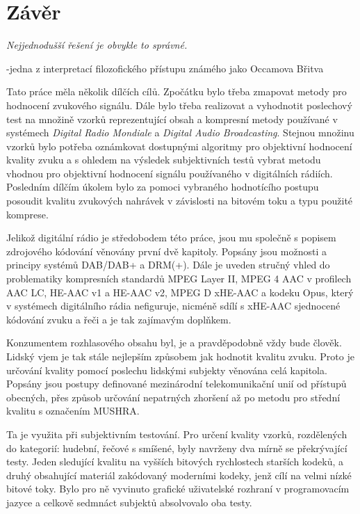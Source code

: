 \chapter{Závěr}
\label{chap:conclusion}

\epigraph{\textit{\hfill Nejjednodušší řešení je obvykle to správné.}}{-jedna z interpretací filozofického přístupu známého jako Occamova Břitva}

Tato práce měla několik dílčích cílů. Zpočátku bylo třeba zmapovat metody pro hodnocení zvukového signálu. Dále bylo třeba realizovat a vyhodnotit poslechový test na množině vzorků reprezentující obsah a kompresní metody používané v systémech \textit{Digital Radio Mondiale} a \textit{Digital Audio Broadcasting}. Stejnou množinu vzorků bylo potřeba oznámkovat dostupnými algoritmy pro objektivní hodnocení kvality zvuku a s ohledem na výsledek subjektivních testů vybrat metodu vhodnou pro objektivní hodnocení signálu používaného v digitálních rádiích. Posledním dílčím úkolem bylo za pomoci vybraného hodnotícího postupu posoudit kvalitu zvukových nahrávek v závislosti na bitovém toku a typu použité komprese.

Jelikož digitální rádio je středobodem této práce, jsou mu společně s popisem zdrojového kódování věnovány první dvě kapitoly. Popsány jsou možnosti a principy systémů DAB/DAB+ a DRM(+). Dále je uveden stručný vhled do problematiky kompresních standardů MPEG Layer II, MPEG 4 AAC v profilech AAC LC, HE-AAC v1 a HE-AAC v2, MPEG D xHE-AAC a kodeku Opus, který v systémech digitálního rádia nefiguruje, nicméně sdílí s xHE-AAC sjednocené kódování zvuku a řeči a je tak zajímavým doplňkem.

Konzumentem rozhlasového obsahu byl, je a pravděpodobně vždy bude člověk. Lidský vjem je tak stále nejlepším způsobem jak hodnotit kvalitu zvuku. Proto je určování kvality pomocí poslechu lidskými subjekty věnována celá kapitola. Popsány jsou postupy definované mezinárodní telekomunikační unií od přístupů obecných, přes způsob určování nepatrných zhoršení až po metodu pro střední kvalitu s označením MUSHRA.

Ta je využita při subjektivním testování. Pro určení kvality vzorků, rozdělených do kategorií: hudební, řečové s smíšené, byly navrženy dva mírně se překrývající testy. Jeden sledující kvalitu na vyšších bitových rychlostech starších kodeků, a druhý obsahující materiál zakódovaný moderními kodeky, jenž cílí na velmi nízké bitové toky. Bylo pro ně vyvinuto grafické uživatelské rozhraní v programovacím jazyce \matlab a celkově sedmnáct subjektů absolvovalo oba testy.

